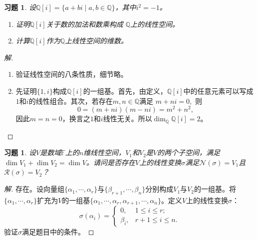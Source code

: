 \documentclass[UTF8]{ctexart}
\newtheorem{ex}[thm]{习题}
\begin{document}
\begin{ex}
设$\mathbb{Q}[i] = \{a+bi \mid a, b \in \mathbb{Q} \}$，其中$i^2 = -1$。
\begin{enumerate}
\item
证明$\mathbb{Q}[i]$关于数的加法和数乘构成 $\mathbb{Q}$上的线性空间。
\item
计算$\mathbb{Q}[i]$作为$\mathbb{Q}$上线性空间的维数。
\end{enumerate}
\end{ex}
\begin{proof}[解]
\begin{enumerate}
\item
验证线性空间的八条性质，细节略。
\item
先证明$\{1, i\}$构成$\mathbb{Q}[i]$的一组基。首先，由定义，$\mathbb{Q}[i]$中的任意元素可以写成$1$和$i$的线性组合。其次，若存在$m, n \in \mathbb{Q}$满足
$m + ni = 0,$
则
\[
0 = (m+ni)(m-ni) = m^2 + n^2,
\]
因此$m = n = 0$，换言之$1$和$i$线性无关。所以$\dim_{\mathbb{Q}}\mathbb{Q}[i] = 2$。
\end{enumerate}
\end{proof}



\begin{ex}
设$V$是数域$\mathbb{F}$上的$n$维线性空间，$V_1$和$V_2$是$V$的两个子空间，满足$\dim V_1 + \dim V_2 = \dim V$。请问是否存在$V$上的线性变换$\sigma$满足$\mathcal{N}(\sigma) = V_1$且 $\mathcal{R}(\sigma) = V_2$？
\end{ex}
\begin{proof}[解]
存在。设向量组$\{\alpha_1, \cdots, \alpha_r\}$与$\{\beta_{r+1}, \cdots, \beta_{n}\}$分别构成$V_1$与$V_2$的一组基。将$\{\alpha_1, \cdots, \alpha_r\}$扩充为$V$的一组基$\{\alpha_1, \cdots, \alpha_r, \alpha_{r+1}, \cdots, \alpha_n\}$。定义$V$上的线性变换$\sigma$：
\[
\sigma(\alpha_i) = \begin{cases}
0, & 1 \leq i \leq r; \\
\beta_i, & r+1 \leq i \leq n.
\end{cases}
\]
验证$\sigma$满足题目中的条件。
\end{proof}
\end{document}
